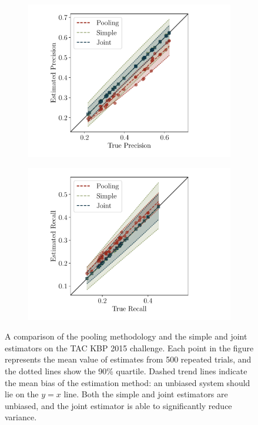 \begin{figure}[t]
  \centering
  \begin{subfigure}{0.49\textwidth}
    \includegraphics[width=\textwidth]{figures/simulation/simulation-p}
  \end{subfigure}
  \begin{subfigure}{0.49\textwidth}
    \includegraphics[width=\textwidth]{figures/simulation/simulation-r}
  \end{subfigure}
  \caption{\label{fig:simulation}
  A comparison of the pooling methodology and the simple and joint estimators on the TAC KBP 2015 challenge.
  Each point in the figure represents the mean value of estimates from 500 repeated trials, and the dotted lines show the 90\% quartile.
  Dashed trend lines indicate the mean bias of the estimation method: an unbiased system should lie on the $y = x$ line.
  Both the simple and joint estimators are unbiased, and the joint estimator is able to significantly reduce variance.
  }
\end{figure}

